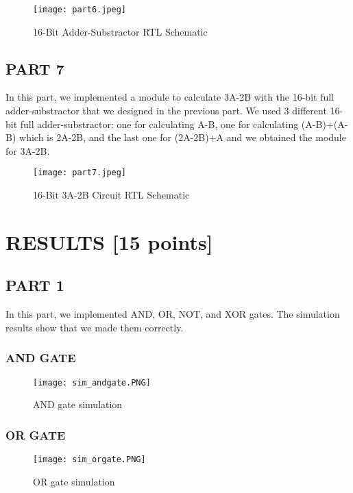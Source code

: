 \documentclass[pdftex,12pt,a4paper]{article}
\begin{document}
\begin{figure}[ht]
	\centering
	\texttt{[image: part6.jpeg]}	
	\caption{16-Bit Adder-Substractor RTL Schematic}
	\label{fig15}
\end{figure}
\clearpage

\subsection{PART 7}
In this part, we implemented a module to calculate 3A-2B with the 16-bit full adder-substractor that we designed in the previous part. We used 3 different 16-bit full adder-substractor: one for calculating A-B, one for calculating (A-B)+(A-B) which is 2A-2B, and the last one for (2A-2B)+A and we obtained the module for 3A-2B.

\begin{figure}[ht]
	\centering
	\texttt{[image: part7.jpeg]}	
	\caption{16-Bit 3A-2B Circuit RTL Schematic}
	\label{fig16}
\end{figure}

\clearpage



\section{RESULTS [15 points]}
\subsection{PART 1}
In this part, we implemented AND, OR, NOT, and XOR gates. The simulation results show that we made them correctly.

\subsubsection{AND GATE}

\begin{figure}[ht]
	\centering
	\texttt{[image: sim\_andgate.PNG]}	
	\caption{AND gate simulation}
	\label{fig9}
\end{figure}

\subsubsection{OR GATE}

\begin{figure}[ht]
	\centering
	\texttt{[image: sim\_orgate.PNG]}	
	\caption{OR gate simulation}
	\label{fig10}
\end{figure}
\end{document}
